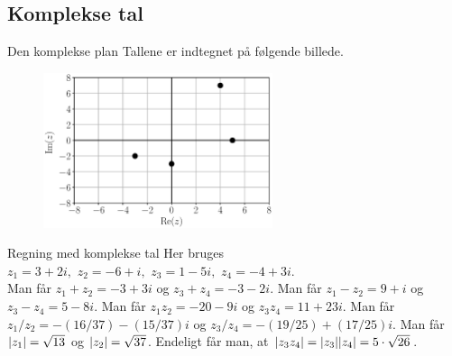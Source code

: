 \subsection*{Komplekse tal}
\begin{opgave}[1]{Den komplekse plan}
Tallene er indtegnet på følgende billede.
\begin{figure}[h!]
	\centering
	\includegraphics[width=0.6\textwidth]{Matematik/matfig/kompleks_plan.eps}
\end{figure}
\end{opgave}
\begin{opgave}[1]{Regning med komplekse tal}
Her bruges $z_1 = 3+2i, \, \, z_2 = -6+i, \, \, z_3 = 1-5i, \, \, z_4 = -4+3i$.\\
\opg Man får $z_1+z_2 = -3+3i$ og $z_3+z_4 = -3-2i$.
\opg Man får $z_1-z_2 = 9+i$ og  $z_3-z_4 = 5-8i$.
\opg Man får $z_1z_2 = -20-9i$ og $z_3z_4 = 11+23i$.
\opg Man får $z_1/z_2 = -(16/37) - (15/37)i$ og $z_3/z_4 = -(19/25)+(17/25)i$.
\opg Man får $\abs{z_1} = \sqrt{13}$ og $\abs{z_2} = \sqrt{37}$. Endeligt får man, at $\abs{z_3z_4} = \abs{z_3} \abs{z_4} = 5 \cdot \sqrt{26}$.
\end{opgave}
